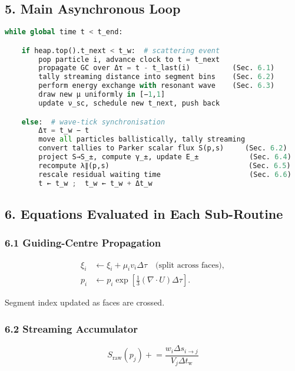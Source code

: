{\subsection*{5. Main Asynchronous Loop}

\begin{lstlisting}[language=Python]
while global time t < t_end:

    if heap.top().t_next < t_w:  # scattering event
        pop particle i, advance clock to t = t_next
        propagate GC over Δτ = t - t_last(i)          (Sec. 6.1)
        tally streaming distance into segment bins    (Sec. 6.2)
        perform energy exchange with resonant wave    (Sec. 6.3)
        draw new μ uniformly in [−1,1]
        update ν_sc, schedule new t_next, push back

    else:  # wave-tick synchronisation
        Δτ = t_w − t
        move all particles ballistically, tally streaming
        convert tallies to Parker scalar flux S(p,s)     (Sec. 6.2)
        project S→S_±, compute γ_±, update E_±            (Sec. 6.4)
        recompute λ∥(p,s)                                 (Sec. 6.5)
        rescale residual waiting time                     (Sec. 6.6)
        t ← t_w ;  t_w ← t_w + Δt_w
\end{lstlisting}

\subsection*{6. Equations Evaluated in Each Sub-Routine}

\subsubsection*{6.1 Guiding-Centre Propagation}

\[
\begin{aligned}
\xi_i &\leftarrow \xi_i + \mu_i v_i \Delta \tau \quad \text{(split across faces)}, \\
p_i &\leftarrow p_i \exp\left[\tfrac13 (\nabla \cdot U)\Delta \tau \right].
\end{aligned}
\]

Segment index updated as faces are crossed.

\subsubsection*{6.2 Streaming Accumulator}

\[
S_{\text{raw}}(p_j) \mathrel{+}= \frac{w_i \Delta s_{i \to j}}{V_j \Delta t_{\mathrm{w}}}
\]

}
